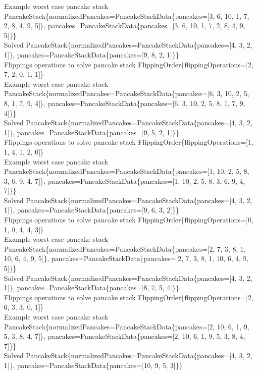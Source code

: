 Example worst case pancake stack PancakeStack\{normalizedPancakes=PancakeStackData\{pancakes=[3, 6, 10, 1, 7, 2, 8, 4, 9, 5]\}, pancakes=PancakeStackData\{pancakes=[3, 6, 10, 1, 7, 2, 8, 4, 9, 5]\}\} \\
Solved PancakeStack\{normalizedPancakes=PancakeStackData\{pancakes=[4, 3, 2, 1]\}, pancakes=PancakeStackData\{pancakes=[9, 8, 2, 1]\}\} \\
Flippings operations to solve pancake stack FlippingOrder\{flippingOperations=[2, 7, 2, 0, 1, 1]\} \\
Example worst case pancake stack PancakeStack\{normalizedPancakes=PancakeStackData\{pancakes=[6, 3, 10, 2, 5, 8, 1, 7, 9, 4]\}, pancakes=PancakeStackData\{pancakes=[6, 3, 10, 2, 5, 8, 1, 7, 9, 4]\}\} \\
Solved PancakeStack\{normalizedPancakes=PancakeStackData\{pancakes=[4, 3, 2, 1]\}, pancakes=PancakeStackData\{pancakes=[9, 5, 2, 1]\}\} \\
Flippings operations to solve pancake stack FlippingOrder\{flippingOperations=[1, 1, 4, 1, 2, 0]\} \\
Example worst case pancake stack PancakeStack\{normalizedPancakes=PancakeStackData\{pancakes=[1, 10, 2, 5, 8, 3, 6, 9, 4, 7]\}, pancakes=PancakeStackData\{pancakes=[1, 10, 2, 5, 8, 3, 6, 9, 4, 7]\}\} \\
Solved PancakeStack\{normalizedPancakes=PancakeStackData\{pancakes=[4, 3, 2, 1]\}, pancakes=PancakeStackData\{pancakes=[9, 6, 3, 2]\}\} \\
Flippings operations to solve pancake stack FlippingOrder\{flippingOperations=[0, 1, 0, 4, 4, 3]\} \\
Example worst case pancake stack PancakeStack\{normalizedPancakes=PancakeStackData\{pancakes=[2, 7, 3, 8, 1, 10, 6, 4, 9, 5]\}, pancakes=PancakeStackData\{pancakes=[2, 7, 3, 8, 1, 10, 6, 4, 9, 5]\}\} \\
Solved PancakeStack\{normalizedPancakes=PancakeStackData\{pancakes=[4, 3, 2, 1]\}, pancakes=PancakeStackData\{pancakes=[8, 7, 5, 4]\}\} \\
Flippings operations to solve pancake stack FlippingOrder\{flippingOperations=[2, 6, 3, 3, 0, 1]\} \\
Example worst case pancake stack PancakeStack\{normalizedPancakes=PancakeStackData\{pancakes=[2, 10, 6, 1, 9, 5, 3, 8, 4, 7]\}, pancakes=PancakeStackData\{pancakes=[2, 10, 6, 1, 9, 5, 3, 8, 4, 7]\}\} \\
Solved PancakeStack\{normalizedPancakes=PancakeStackData\{pancakes=[4, 3, 2, 1]\}, pancakes=PancakeStackData\{pancakes=[10, 9, 5, 3]\}\} \\
